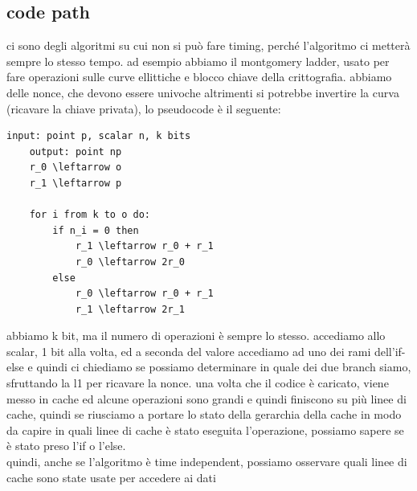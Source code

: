 \documentclass[12pt, oneside]{extbook} %
\begin{document}
\subsection{code path}
ci sono degli algoritmi su cui non si può fare timing, perché l'algoritmo ci metterà sempre lo stesso tempo. ad esempio abbiamo il montgomery ladder, usato per fare operazioni sulle curve ellittiche e blocco chiave della crittografia. abbiamo delle nonce, che devono essere univoche altrimenti si potrebbe invertire la curva (ricavare la chiave privata), lo pseudocode è il seguente:
\begin{lstlisting}[mathescape]
	input: point p, scalar n, k bits
	output: point np
	r_0 \leftarrow o
	r_1 \leftarrow p
	
	for i from k to o do:
		if n_i = 0 then
			r_1 \leftarrow r_0 + r_1
			r_0 \leftarrow 2r_0
		else
			r_0 \leftarrow r_0 + r_1
			r_1 \leftarrow 2r_1
\end{lstlisting}
abbiamo k bit, ma il numero di operazioni è sempre lo stesso. accediamo allo scalar, 1 bit alla volta, ed a seconda del valore accediamo ad uno dei rami dell'if-else e quindi ci chiediamo se possiamo determinare in quale dei due branch siamo, sfruttando la l1 per ricavare la nonce. una volta che il codice è caricato, viene messo in cache ed alcune operazioni sono grandi e quindi finiscono su più linee di cache, quindi se riusciamo a portare lo stato della gerarchia della cache in modo da capire in quali linee di cache è stato eseguita l'operazione, possiamo sapere se è stato preso l'if o l'else.\\ quindi, anche se l'algoritmo è time independent, possiamo osservare quali linee di cache sono state usate per accedere ai dati
\end{document}
